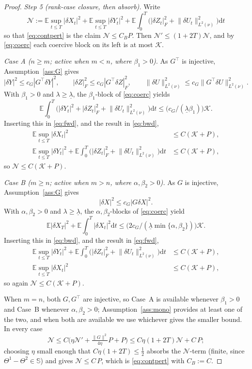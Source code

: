 \documentclass[preprint,12pt]{elsarticle}
\newcommand{\E}{\mathbb{E}}
\newcommand{\diff}{\mathrm{d}}
\newcommand{\Lnu}{L^2(\nu)}
\newcommand{\Gstar}{G^{\!\top}}
\newcommand{\HH}{\mathbb{S}}
\newcommand{\Lnorm}[1]{\lVert #1\rVert_{\Lnu}}
\numberwithin{equation}{section}
\theoremstyle{plain}
\theoremstyle{definition}
\theoremstyle{\PaperRemarkStyle}
\begin{document}
\begin{proof}
\emph{Step 5 (rank-case closure, then absorb).} Write
\[
\mathcal N:=\E\sup_{t\le T}|\delta X_t|^2+\E\sup_{t\le T}|\delta Y_t|^2+\E\!\int_0^T\!\big(|\delta Z_t|_F^2+\Lnorm{\delta U_t}^2\big)\diff t
\]
so that \eqref{eq:contpert} is the claim $\mathcal N\le C_B P$. Then
$\mathcal N'\le(1+2T)\mathcal N$, and by
\eqref{eq:coerc} each coercive block on its left is at most $\mathcal K$.

\emph{Case A ($n\ge m$; active when $m<n$, where $\beta_1>0$).} As $\Gstar$ is injective,
Assumption~\ref{ass:G} gives
\[
|\delta Y|^2\le c_G|\Gstar\delta Y|^2,\qquad
|\delta Z|_F^2\le c_G|\Gstar\delta Z|_F^2,\qquad
\Lnorm{\delta U}^2\le c_G\Lnorm{\Gstar\delta U}^2 .
\]
With $\beta_1>0$ and $\lambda\ge\underline\lambda$, the $\beta_1$-block of \eqref{eq:coerc} yields
\[
\E\!\int_0^T\!\big(|\delta Y_t|^2+|\delta Z_t|_F^2+\Lnorm{\delta U_t}^2\big)\diff t\le\bigl(c_G/(\underline\lambda\beta_1)\bigr)\mathcal K.
\]
Inserting this in \eqref{eq:fwd}, and the result in \eqref{eq:bwd},
\[
\begin{aligned}
\E\sup_{t\le T}|\delta X_t|^2&\le C(\mathcal K+P),\\
\E\sup_{t\le T}|\delta Y_t|^2
+\E\!\int_0^T\!\big(|\delta Z_t|_F^2+\Lnorm{\delta U_t}^2\big)\diff t&\le C(\mathcal K+P),
\end{aligned}
\]
so $\mathcal N\le C(\mathcal K+P)$.

\emph{Case B ($m\ge n$; active when $m>n$, where $\alpha,\beta_2>0$).} As $G$ is injective,
Assumption~\ref{ass:G} gives
\[
|\delta X|^2\le c_G|G\delta X|^2 .
\]
With $\alpha,\beta_2>0$ and $\lambda\ge\underline\lambda$, the $\alpha,\beta_2$-blocks of
\eqref{eq:coerc} yield
\[
\E|\delta X_T|^2+\E\!\int_0^T\!|\delta X_t|^2\diff t\le\bigl(2c_G/(\underline\lambda\min\{\alpha,\beta_2\})\bigr)\mathcal K.
\]
Inserting this in \eqref{eq:bwd}, and the result in \eqref{eq:fwd},
\[
\begin{aligned}
\E\sup_{t\le T}|\delta Y_t|^2
+\E\!\int_0^T\!\big(|\delta Z_t|_F^2+\Lnorm{\delta U_t}^2\big)\diff t&\le C(\mathcal K+P),\\
\E\sup_{t\le T}|\delta X_t|^2&\le C(\mathcal K+P),
\end{aligned}
\]
so again $\mathcal N\le C(\mathcal K+P)$.

When $m=n$, both $G,\Gstar$ are injective, so Case~A is available whenever $\beta_1>0$ and
Case~B whenever $\alpha,\beta_2>0$; Assumption~\ref{ass:mono} provides at least one of the
two, and when both are available we use whichever gives the smaller bound. In every
case
\[
\mathcal N\le C\Big(\eta\mathcal N'+\tfrac{\|G\|^2}{4\eta} P+P\Big)\le C\eta(1+2T)\mathcal N+C\,P;
\]
choosing $\eta$
small enough that $C\eta(1+2T)\le\tfrac12$ absorbs the $\mathcal N$-term (finite,
since $\Theta^1-\Theta^2\in\HH$) and gives
$\mathcal N\le C\,P$, which is \eqref{eq:contpert} with $C_B:=C$.
\end{proof}
\end{document}
